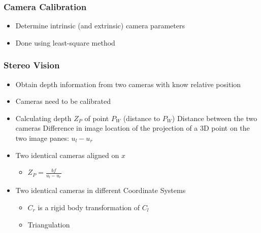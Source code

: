 \subsubsection{Camera Calibration}
\begin{itemize}
    \item Determine intrinsic (and extrinsic) camera parameters
    \item Done using least-square method
\end{itemize}

\subsubsection{Stereo Vision}
\begin{itemize}
    \item Obtain depth information from two cameras with know relative position
    \item Cameras need to be calibrated
    \item Calculating depth $Z_P$ of point $P_W$ (distance to $P_W$)
     Distance between the two cameras
     Difference in image location of the projection of a 3D point on the two image panes: $u_l - u_r$
    \item Two identical cameras aligned on $x$
        \begin{itemize}
            \item $Z_P = \frac{bf}{u_l - u_r}$
        \end{itemize}
    \item Two identical cameras in different Coordinate Systems
        \begin{itemize}
            \item $C_r$ is a rigid body transformation of $C_l$\\
            \item Triangulation
\end{itemize}
\end{itemize}
